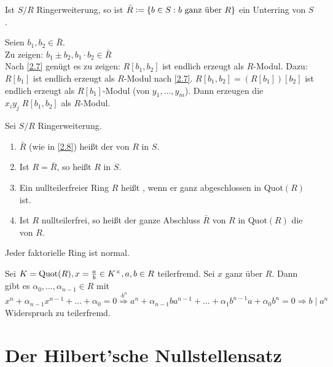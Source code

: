 \documentclass[a4paper, 10pt]{report}
\begin{document}
\begin{Prop}
\label{2.8}
  Ist $S/R$ Ringerweiterung, so ist $\bar{R} \mathrel{\mathop:}= \{ b \in S: b \text{ ganz 
  über } R \}$ ein Unterring von $S$.
\end{Prop}

\begin{Bew} 
  Seien $b_1, b_2 \in \bar{R}$.\\
  Zu zeigen: $b_1 \pm b_2, b_1 \cdot b_2 \in \bar{R}$\\
  Nach \ref{2.7} genügt es zu zeigen: $R[b_1, b_2]$ ist endlich erzeugt als
  $R$-Modul.
  Dazu: $R[b_1]$ ist endlich erzeugt als $R$-Modul nach \ref{2.7}.
  $R[b_1, b_2] = (R[b_1])[b_2]$ ist endlich erzeugt als $R[b_1]$-Modul (von
  $y_1, \dots, y_m$).
  Dann erzeugen die $x_i y_j \; R[b_1, b_2]$ als $R$-Modul.
\end{Bew}

\begin{Def} 
  Sei $S/R$ Ringerweiterung.
  \begin{enumerate} 
    \item $\bar{R}$ (wie in \ref{2.8}) heißt der  von $R$ in $S$.
    \item Ist $R = \bar{R}$, so heißt $R$  in $S$.
    \item Ein nullteilerfreier Ring $R$ heißt , wenn er ganz
          abgeschlossen in Quot$(R)$ ist.
    \item Ist $R$ nullteilerfrei, so heißt der ganze Abschluss $\bar{R}$ von $R$
          in Quot$(R)$ die  von $R$.
  \end{enumerate}
\end{Def}

\begin{Bem}
\label{2.10}
  Jeder faktorielle Ring ist normal.
\end{Bem}

\begin{Bew} 
  Sei $K=\Quot{R}, x= \frac{a}{b} \in K^\times, a,b \in R$ teilerfremd.
  Sei $x$ ganz über $R$. Dann gibt es $\alpha_0, \dots, \alpha_{n-1} \in R$ mit
  $x^n + \alpha_{n-1} x^{n-1} + \dots + \alpha_0 = 0 \overset{\cdot b^n}{\Rightarrow}
  a^n + \alpha_{n-1} b a^{n-1} + \dots + \alpha_1 b^{n-1} a + \alpha_0 b^n = 0
  \Rightarrow b \mid a^n$ Widerspruch zu teilerfremd.
\end{Bew}

\section{Der Hilbert'sche Nullstellensatz}
\end{document}
